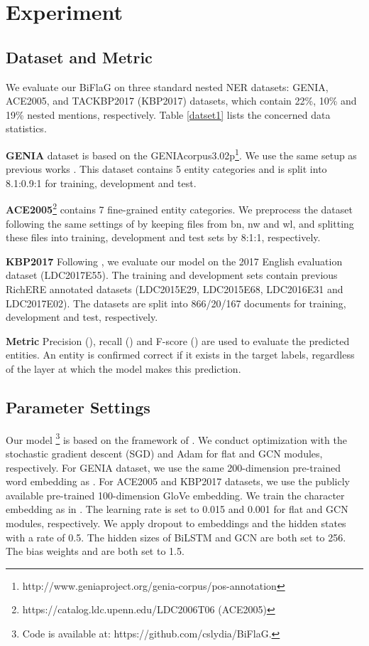 \documentclass[11pt,a4paper]{article}
\begin{document}
\section{Experiment}

\subsection{Dataset and Metric}
We evaluate our BiFlaG on three standard nested NER datasets: GENIA, ACE2005, and TACKBP2017 (KBP2017) datasets, which  contain 22\%, 10\% and 19\% nested mentions, respectively. Table \ref{datset1} lists the concerned data statistics.

\textbf{GENIA} dataset \cite{kim2003genia} is based on the GENIAcorpus3.02p\footnote{http://www.geniaproject.org/genia-corpus/pos-annotation}. We use the same setup as previous works \cite{finkel2009nested, lu2015joint, lin2019sequence}. This dataset contains 5 entity categories
and is split into 8.1:0.9:1 for training, development and test.

\textbf{ACE2005}\footnote{https://catalog.ldc.upenn.edu/LDC2006T06 (ACE2005)} \cite{walker2006ace} contains 7 fine-grained entity categories. We preprocess the dataset following
the same settings of \cite{lu2015joint,wang2018neural, katiyar2018nested, lin2019sequence} by keeping files from bn, nw
and wl, and splitting these files into training, development and
test sets by 8:1:1, respectively. 

\textbf{KBP2017} Following \cite{lin2019sequence}, we evaluate our model on the 2017 English evaluation dataset (LDC2017E55). The training and development sets contain previous RichERE annotated datasets (LDC2015E29,
LDC2015E68, LDC2016E31 and LDC2017E02).
The datasets are split into 866/20/167 documents
for training, development and test, respectively.

\textbf{Metric} Precision (), recall () and F-score () are
used to evaluate the predicted entities. 
An entity is confirmed correct if it exists in the
target labels, regardless of the layer at which the model makes this prediction.


\subsection{Parameter Settings} 
Our model \footnote{Code is available at: https://github.com/cslydia/BiFlaG.} is based on the framework of \cite{yang2018ncrf}.
We conduct optimization with the stochastic gradient descent (SGD) and Adam for flat  and GCN modules, respectively. For GENIA dataset, we use the same 200-dimension pre-trained word embedding as \cite{ju2018neural, sohrab2018deep, zheng2019boundary}. For ACE2005 and KBP2017 datasets,
we use the publicly available pre-trained 100-dimension GloVe \cite{pennington2014glove} embedding.
We train the character embedding as in \cite{xin2018learning}. 
The learning rate is set to 0.015 and 0.001 for flat and GCN modules, respectively. We apply
dropout to embeddings and the hidden states  with a rate of 0.5.
The hidden sizes of BiLSTM and GCN are both set to 256. The bias weights  and  are both set to 1.5.
\end{document}
